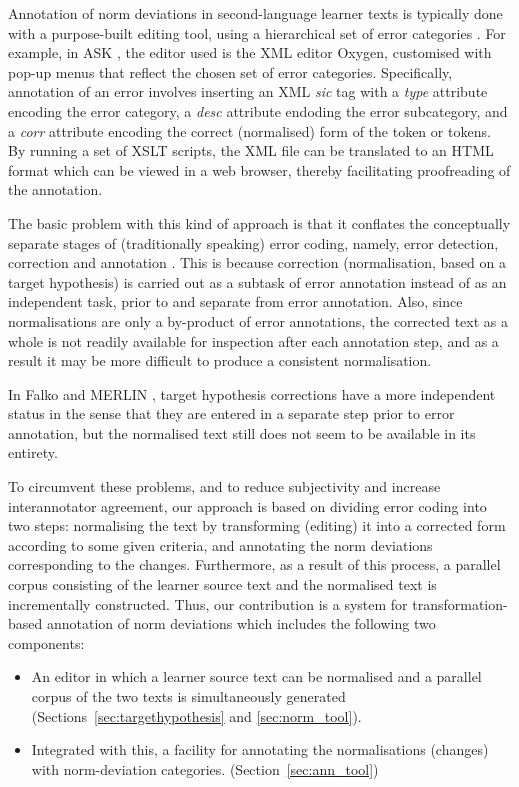 \documentclass[10pt, a4paper]{article}
\begin{document}
Annotation of norm deviations in second-language learner texts is typically done with a purpose-built editing tool, using a hierarchical set of error categories \cite{Granger2008}. For example, in ASK \cite{tenfjord2006ask}, the editor used is the XML editor Oxygen, customised with pop-up menus that reflect the chosen set of error categories. Specifically, annotation of an error involves inserting an XML
{\em sic} tag with a {\em type} attribute encoding the error category, a {\em desc} attribute endoding the error subcategory, and a {\em corr} attribute encoding the correct (normalised) form of the token or tokens. By running a set of XSLT scripts, the XML file can be translated to an HTML format which can be viewed in a web browser, thereby facilitating proofreading of the annotation.

The basic problem with this kind of approach is that it conflates the conceptually separate stages of (traditionally speaking) error coding, namely, error detection, correction and annotation
\cite[page 266]{Ellis1994,Granger2008}. This is because correction (normalisation, based on a target hypothesis) is carried out as a subtask of error annotation instead of as an independent task, prior to and separate from error annotation. Also, since normalisations are only a by-product of error annotations, the corrected text as a whole is not readily available for inspection after each annotation step, and as a result it may be more difficult to produce a consistent normalisation.

In Falko \cite{ludeling05multi-levelerror} and MERLIN \cite{MERLIN2014}, target hypothesis corrections have a more independent status in the sense that they are entered in a separate step prior to error annotation, but the normalised text still does not seem to be available in its entirety.

To circumvent these problems, and to reduce subjectivity and increase interannotator agreement, our approach is based on dividing error coding into two steps: normalising the text by transforming (editing) it into a corrected form according to some given criteria, and annotating the norm deviations corresponding to the changes. Furthermore, as a result of this process, a parallel corpus consisting of the learner source text and the normalised text is incrementally constructed. Thus, our contribution is a system for transformation-based annotation of norm deviations which includes the following two components:

\begin{itemize}
\item An editor in which a learner source text can be normalised and a parallel corpus of the two texts is simultaneously generated (Sections~\ref{sec:targethypothesis} and \ref{sec:norm_tool}).
\item Integrated with this, a facility for annotating the normalisations (changes) with norm-deviation categories. (Section~\ref{sec:ann_tool})
\end{itemize}
\end{document}
